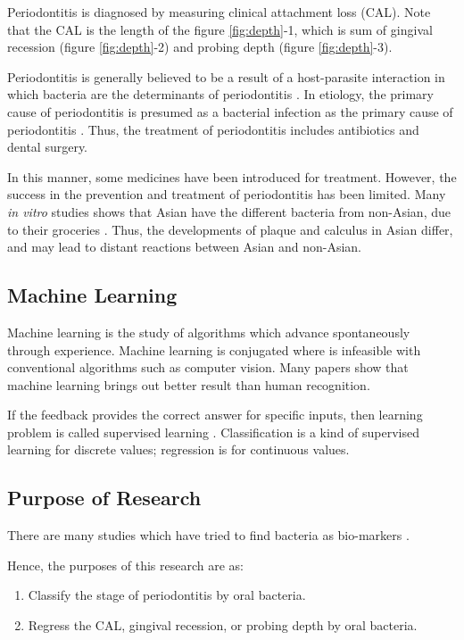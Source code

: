\documentclass[aps, 11pt, a4paper]{article}
\begin{document}
    		Periodontitis is diagnosed by measuring clinical attachment loss (CAL). Note that the CAL is the length of the figure \ref{fig:depth}-1, which is sum of gingival recession (figure \ref{fig:depth}-2) and probing depth (figure \ref{fig:depth}-3).
    		
    		Periodontitis is generally believed to be a result of a host-parasite interaction in which bacteria are the determinants of periodontitis \cite{ref:cause1}. In etiology, the primary cause of periodontitis is presumed as a bacterial infection as the primary cause of periodontitis \cite{ref:perio1}. Thus, the treatment of periodontitis includes antibiotics and dental surgery.
    		
    		In this manner, some medicines have been introduced for treatment. However, the success in the prevention and treatment of periodontitis has been limited. Many \textit{in vitro} studies shows that Asian have the different bacteria from non-Asian, due to their groceries \cite{ref:asian1}. Thus, the developments of plaque and calculus in Asian differ, and may lead to distant reactions between Asian and non-Asian.
    		
    	\subsection{Machine Learning}
    		Machine learning is the study of algorithms which advance spontaneously through experience. Machine learning is conjugated where is infeasible with conventional algorithms such as computer vision.  Many papers show that machine learning brings out better result than human recognition. 
    	
    		If the feedback provides the correct answer for specific inputs, then learning problem is called supervised learning \cite{ref:ai1}. Classification is a kind of supervised learning for discrete values; regression is for continuous values.
    		
    	\subsection{Purpose of Research}
    		There are many studies which have tried to find bacteria as bio-markers \cite{ref:biomarker1, ref:biomarker2}. 
    		
    		Hence, the purposes of this research are as:
    		\begin{enumerate}
				\item Classify the stage of periodontitis by oral bacteria.
				\item Regress the CAL, gingival recession, or probing depth by oral bacteria. 
    		\end{enumerate}
    
\end{document}
